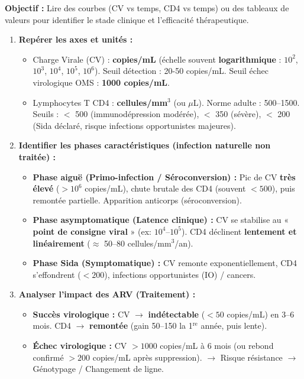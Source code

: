 \documentclass[11pt]{article}
\begin{document}
\begin{methode}
\textbf{Objectif :} Lire des courbes (CV vs temps, CD4 vs temps) ou des tableaux de valeurs pour identifier le stade clinique et l'efficacité thérapeutique.
\begin{enumerate}
    \item \textbf{Repérer les axes et unités :}
    \begin{itemize}
        \item Charge Virale (CV) : \textbf{copies/mL} (échelle souvent \textbf{logarithmique} : $10^2$, $10^3$, $10^4$, $10^5$, $10^6$). Seuil détection : 20-50 copies/mL. Seuil échec virologique OMS : \textbf{1000 copies/mL}.
        \item Lymphocytes T CD4 : \textbf{cellules/mm$^3$} (ou $\mu$L). Norme adulte : 500--1500. Seuils : $<$ 500 (immunodépression modérée), $<$ 350 (sévère), $<$ 200 (Sida déclaré, risque infections opportunistes majeures).
    \end{itemize}
    \item \textbf{Identifier les phases caractéristiques (infection naturelle non traitée) :}
    \begin{itemize}
        \item \textbf{Phase aiguë (Primo-infection / Séroconversion) :} Pic de CV \textbf{très élevé} ($> 10^6$ copies/mL), chute brutale des CD4 (souvent $< 500$), puis remontée partielle. Apparition anticorps (séroconversion).
        \item \textbf{Phase asymptomatique (Latence clinique) :} CV se stabilise au « \textbf{point de consigne viral} » (ex: $10^4$--$10^5$). CD4 déclinent \textbf{lentement et linéairement} ($\approx$ 50--80 cellules/mm$^3$/an).
        \item \textbf{Phase Sida (Symptomatique) :} CV remonte exponentiellement, CD4 s'effondrent ($< 200$), infections opportunistes (IO) / cancers.
    \end{itemize}
    \item \textbf{Analyser l'impact des ARV (Traitement) :}
    \begin{itemize}
        \item \textbf{Succès virologique :} CV $\rightarrow$ \textbf{indétectable} ($< 50$ copies/mL) en 3--6 mois. CD4 $\rightarrow$ \textbf{remontée} (gain 50--150 la 1$^{\text{re}}$ année, puis lente).
        \item \textbf{Échec virologique :} CV $> 1000$ copies/mL à 6 mois (ou rebond confirmé $> 200$ copies/mL après suppression). $\rightarrow$ Risque résistance $\rightarrow$ Génotypage / Changement de ligne.

\end{itemize}
\end{enumerate}
\end{methode}
\end{document}
